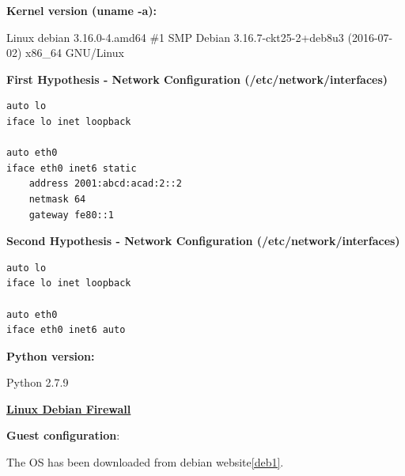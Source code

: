 \documentclass[12pt]{article}
\begin{document}
\textbf{Kernel version (uname -a):} 

\vspace{-10pt}
Linux debian 3.16.0-4.amd64 \#1 SMP Debian 3.16.7-ckt25-2+deb8u3 (2016-07-02) x86_64 GNU/Linux

\textbf{First Hypothesis - Network Configuration (/etc/network/interfaces)}
\vspace{-5pt}
\begin{lstlisting}[style=python,basicstyle=\ttfamily\scriptsize]
auto lo
iface lo inet loopback

auto eth0
iface eth0 inet6 static
	address 2001:abcd:acad:2::2
	netmask 64
	gateway fe80::1
\end{lstlisting}

\vspace{-10pt}
\textbf{Second Hypothesis - Network Configuration (/etc/network/interfaces)}
\vspace{-5pt}
\begin{lstlisting}[style=python,basicstyle=\ttfamily\scriptsize]
auto lo
iface lo inet loopback

auto eth0
iface eth0 inet6 auto
\end{lstlisting}

\textbf{Python version:} 

\vspace{-10pt}
Python 2.7.9

\textbf{\underline{Linux Debian Firewall}}

\vspace{-10pt}
\textbf{Guest configuration}:
\begin{savenotes}
\begin{table}[!htpb]
\centering
\addtolength{\tabcolsep}{1pt}
\noindent{}
\caption{Linux Debian Firewall}
\label{table:linuxDebFirewall}
\end{table}
\end{savenotes}

The OS has been downloaded from debian website\cref{deb1}.
\end{document}
